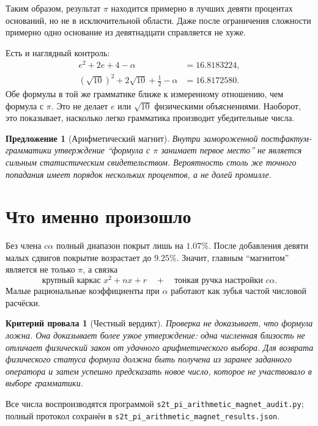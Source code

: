 \documentclass[12pt,a4paper]{article}
\newtheorem{proposition}{Предложение}
\newtheorem{nogocriterion}{Критерий провала}
\begin{document}
Таким образом, результат $\pi$ находится примерно в лучших девяти процентах
оснований, но не в исключительной области. Даже после ограничения сложности
примерно одно основание из девятнадцати справляется не хуже.

Есть и наглядный контроль:
\begin{align}
 e^2+2e+4-\alpha
 &=16.8183224,\\
 (\sqrt{10})^2+2\sqrt{10}+\frac12-\alpha
 &=16.8172580.
\end{align}
Обе формулы в той же грамматике ближе к измеренному отношению, чем формула с
$\pi$. Это не делает $e$ или $\sqrt{10}$ физическими объяснениями. Наоборот,
это показывает, насколько легко грамматика производит убедительные числа.

\begin{proposition}[Арифметический магнит]
Внутри замороженной постфактум-грамматики утверждение ``формула с $\pi$
занимает первое место'' не является сильным статистическим свидетельством.
Вероятность столь же точного попадания имеет порядок нескольких процентов, а
не долей промилле.
\end{proposition}

\section{Что именно произошло}

Без члена $c\alpha$ полный диапазон покрыт лишь на $1.07\%$. После добавления
девяти малых сдвигов покрытие возрастает до $9.25\%$. Значит, главным
``магнитом'' является не только $\pi$, а связка
\begin{equation}
 \text{крупный каркас }x^2+nx+r
 \quad+\quad
 \text{тонкая ручка настройки }c\alpha.
\end{equation}
Малые рациональные коэффициенты при $\alpha$ работают как зубья частой
числовой расчёски.

\begin{nogocriterion}[Честный вердикт]
Проверка не доказывает, что формула ложна. Она доказывает более узкое
утверждение: одна численная близость не отличает физический закон от удачного
арифметического выбора. Для возврата физического статуса формула должна быть
получена из заранее заданного оператора и затем успешно предсказать новое
число, которое не участвовало в выборе грамматики.
\end{nogocriterion}

Все числа воспроизводятся программой
\texttt{s2t\_pi\_arithmetic\_magnet\_audit.py}; полный протокол сохранён в
\texttt{s2t\_pi\_arithmetic\_magnet\_results.json}.
\end{document}
